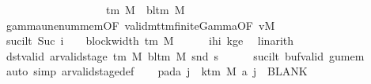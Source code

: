 \begin{isabellebody}
\ \ \ \ \ \ \ \ \ \ \ \ \ \ \ \ \ \ {\isasymin}\ {\isasymGamma}{\isacharunderscore}{\kern0pt}tm\ M\ {\isasymunion}\ {\isacharbraceleft}{\kern0pt}bl{\isacharunderscore}{\kern0pt}tm\ M{\isacharbraceright}{\kern0pt}{\isachardoublequoteclose}\isanewline
\ \ \ \ \isamarkupfalse%
\ gamma{\isacharunderscore}{\kern0pt}unenum{\isacharunderscore}{\kern0pt}mem{\isacharbrackleft}{\kern0pt}OF\ valid{\isacharunderscore}{\kern0pt}mttm{\isacharunderscore}{\kern0pt}finite{\isacharunderscore}{\kern0pt}Gamma{\isacharbrackleft}{\kern0pt}OF\ vM{\isacharbrackright}{\kern0pt}{\isacharbrackright}{\kern0pt}\ \isakeywordONE{{\isachardot}{\kern0pt}}\isamarkupfalse%
\isanewline
\ \ \isamarkupfalse%
\ suc{\isacharunderscore}{\kern0pt}i{\isacharunderscore}{\kern0pt}lt{\isacharcolon}{\kern0pt}\ {\isachardoublequoteopen}Suc\ i\ {\isacharless}{\kern0pt}\ {}\ {\isacharasterisk}{\kern0pt}\ block{\isacharunderscore}{\kern0pt}width\ {\isacharparenleft}{\kern0pt}{\isasymGamma}{\isacharunderscore}{\kern0pt}tm\ M{\isacharparenright}{\kern0pt}{\isachardoublequoteclose}\isanewline
\ \ \ \ \isamarkupfalse%
\ ihi\ kge{}\ \isamarkupfalse%
\ linarith\isanewline
\ \ \isamarkupfalse%
\ dst{\isacharunderscore}{\kern0pt}valid{\isacharcolon}{\kern0pt}\ {\isachardoublequoteopen}ar{\isacharunderscore}{\kern0pt}valid{\isacharunderscore}{\kern0pt}stage\ {\isacharparenleft}{\kern0pt}{\isasymGamma}{\isacharunderscore}{\kern0pt}tm\ M{\isacharparenright}{\kern0pt}\ {\isacharparenleft}{\kern0pt}bl{\isacharunderscore}{\kern0pt}tm\ M{\isacharparenright}{\kern0pt}\ {\isacharparenleft}{\kern0pt}snd\ {\isacharquery}{\kern0pt}s{\isacharprime}{\kern0pt}{\isacharparenright}{\kern0pt}{\isachardoublequoteclose}\isanewline
\ \ \ \ \isamarkupfalse%
\ suc{\isacharunderscore}{\kern0pt}i{\isacharunderscore}{\kern0pt}lt\ buf{\isacharunderscore}{\kern0pt}valid\ gu{\isacharunderscore}{\kern0pt}mem\ \isamarkupfalse%
\ {\isacharparenleft}{\kern0pt}auto\ simp{\isacharcolon}{\kern0pt}\ ar{\isacharunderscore}{\kern0pt}valid{\isacharunderscore}{\kern0pt}stage{\isacharunderscore}{\kern0pt}def{\isacharparenright}{\kern0pt}\isanewline
\ \ \isamarkupfalse%
\ pad{\isacharunderscore}{\kern0pt}a{\isacharcolon}{\kern0pt}\ {\isachardoublequoteopen}{\isasymforall}j\ {\isasymge}\ k{\isacharunderscore}{\kern0pt}tm\ M{\isachardot}{\kern0pt}\ {\isacharquery}{\kern0pt}a\ j\ {\isacharequal}{\kern0pt}\ BLANK{}{\isachardoublequoteclose}\ \isamarkupfalse%

\end{isabellebody}
